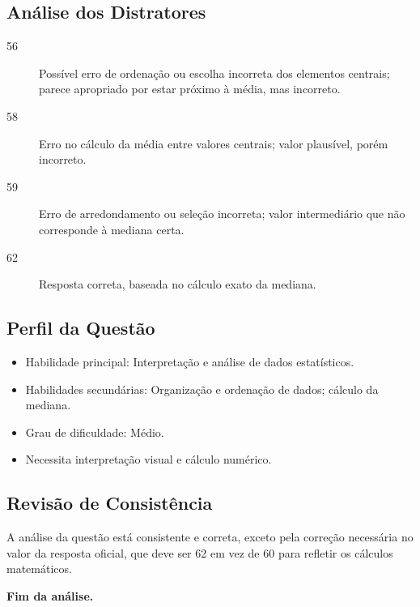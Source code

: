 \documentclass{article}
\begin{document}
\subsection*{Análise dos Distratores}
\begin{description}
\item[56] Possível erro de ordenação ou escolha incorreta dos elementos centrais; parece apropriado por estar próximo à média, mas incorreto.
\item[58] Erro no cálculo da média entre valores centrais; valor plausível, porém incorreto.
\item[59] Erro de arredondamento ou seleção incorreta; valor intermediário que não corresponde à mediana certa.
\item[62] Resposta correta, baseada no cálculo exato da mediana.
\end{description}

\subsection*{Perfil da Questão}
\begin{itemize}
\item Habilidade principal: Interpretação e análise de dados estatísticos.
\item Habilidades secundárias: Organização e ordenação de dados; cálculo da mediana.
\item Grau de dificuldade: Médio.
\item Necessita interpretação visual e cálculo numérico.
\end{itemize}

\subsection*{Revisão de Consistência}
A análise da questão está consistente e correta, exceto pela correção necessária no valor da resposta oficial, que deve ser 62 em vez de 60 para refletir os cálculos matemáticos.

\vspace{1em}

\textbf{Fim da análise.}
\end{document}
